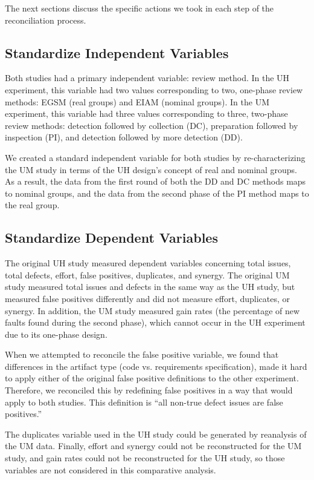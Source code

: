 The next sections discuss the specific actions we took in each step
of the reconciliation process.


\subsection{Standardize Independent Variables}

Both studies had a primary independent variable: review method.  
In the UH experiment,
this variable had two values corresponding to two, one-phase review methods:
EGSM (real groups) and EIAM (nominal groups).  In the UM experiment, this
variable had three values corresponding to three, two-phase review methods:
detection followed by collection (DC), preparation followed by inspection
(PI), and detection followed by more detection (DD).

We created a standard independent variable for both studies by
re-characterizing the UM study in terms of the UH design's concept of real
and nominal groups.  As a result, the data from the first round of both the
DD and DC methods maps to nominal groups, and the data from the second
phase of the PI method maps to the real group. 


\subsection{ Standardize Dependent Variables}

The original UH study measured dependent variables concerning total
issues, total defects, effort, false positives, duplicates, and synergy.
The original UM study measured total issues and defects in the same way as
the UH study, but measured false positives differently and did not measure
effort, duplicates, or synergy.  In addition, the UM study measured gain
rates (the percentage of new faults found during the second phase), which
cannot occur in the UH experiment due to its one-phase design.

When we attempted to reconcile the false positive variable, we found that
differences in the artifact type (code vs. requirements
specification), made it hard to apply either of the original false 
positive definitions to the other experiment. Therefore, we reconciled this 
by redefining false positives in a way that would apply to both studies. 
This definition is ``all non-true defect issues are false positives.''

The duplicates variable used in the UH study could be generated by
reanalysis of the UM data. Finally, effort and synergy could not be 
reconstructed for the UM study,
and gain rates could not be reconstructed for the UH study, so those
variables are not considered in this comparative analysis.

